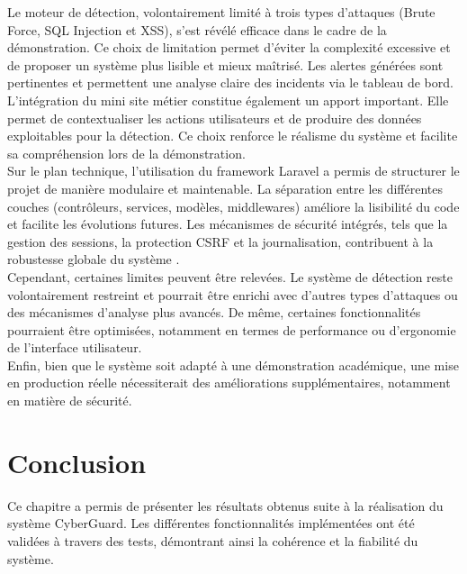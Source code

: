 \documentclass[a4paper,12pt]{report}
\begin{document}
    Le moteur de détection, volontairement limité à trois types d’attaques (Brute Force, SQL Injection et XSS), s’est révélé efficace dans le cadre de la démonstration. Ce choix de limitation permet d’éviter la complexité excessive et de proposer un système plus lisible et mieux maîtrisé. Les alertes générées sont pertinentes et permettent une analyse claire des incidents via le tableau de bord.\\
    
    L’intégration du mini site métier constitue également un apport important. Elle permet de contextualiser les actions utilisateurs et de produire des données exploitables pour la détection. Ce choix renforce le réalisme du système et facilite sa compréhension lors de la démonstration.\\
    
    Sur le plan technique, l’utilisation du framework Laravel a permis de structurer le projet de manière modulaire et maintenable. La séparation entre les différentes couches (contrôleurs, services, modèles, middlewares) améliore la lisibilité du code et facilite les évolutions futures. Les mécanismes de sécurité intégrés, tels que la gestion des sessions, la protection CSRF et la journalisation, contribuent à la robustesse globale du système \cite{laravel}.\\
    
    Cependant, certaines limites peuvent être relevées. Le système de détection reste volontairement restreint et pourrait être enrichi avec d’autres types d’attaques ou des mécanismes d’analyse plus avancés. De même, certaines fonctionnalités pourraient être optimisées, notamment en termes de performance ou d’ergonomie de l’interface utilisateur.\\
    
    Enfin, bien que le système soit adapté à une démonstration académique, une mise en production réelle nécessiterait des améliorations supplémentaires, notamment en matière de sécurité.
    
    \section{Conclusion}
    
    Ce chapitre a permis de présenter les résultats obtenus suite à la réalisation du système CyberGuard. Les différentes fonctionnalités implémentées ont été validées à travers des tests, démontrant ainsi la cohérence et la fiabilité du système.
    
\end{document}

